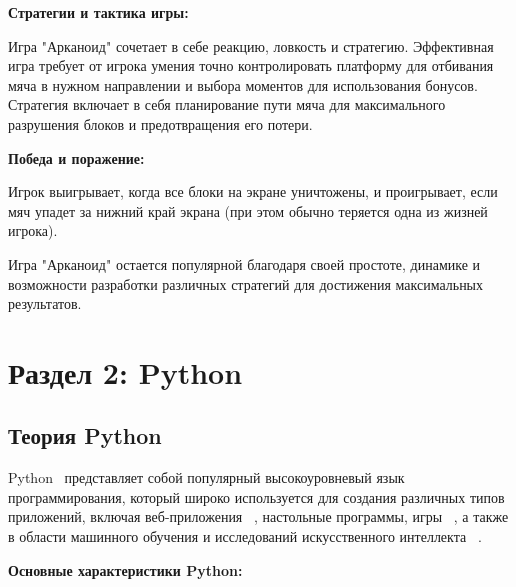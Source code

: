  \textbf{Стратегии и тактика игры:}
 
Игра "Арканоид" сочетает в себе реакцию, ловкость и стратегию. Эффективная игра требует от игрока умения точно контролировать платформу для отбивания мяча в нужном направлении и выбора моментов для использования бонусов. Стратегия включает в себя планирование пути мяча для максимального разрушения блоков и предотвращения его потери.

 \textbf{Победа и поражение:}
 
Игрок выигрывает, когда все блоки на экране уничтожены, и проигрывает, если мяч упадет за нижний край экрана (при этом обычно теряется одна из жизней игрока).

Игра "Арканоид" остается популярной благодаря своей простоте, динамике и возможности разработки различных стратегий для достижения максимальных результатов.


\section{\label{sec:ch01/sec02}Раздел 2: Python}
    
\subsection{\label{subsec:ch01/sec02/sub01}Теория Python}
Python ~\cite{book1author}представляет собой популярный высокоуровневый язык программирования, который широко используется для создания различных типов приложений, включая веб-приложения ~\cite{book1author4}, настольные программы, игры ~\cite{book1author2}, а также в области машинного обучения и исследований искусственного интеллекта ~\cite{book1author3}.

\textbf{Основные характеристики Python:}

